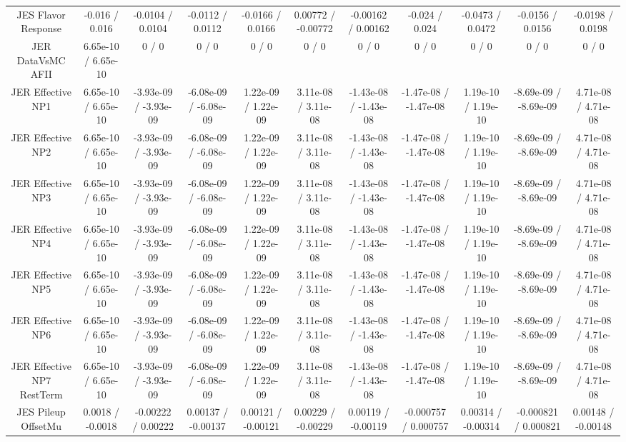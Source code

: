 \begin{table}[htbp]
\begin{center}
\begin{tabular}{|c|c|c|c|c|c|c|c|c|c|c|}
  JES Flavor Response & -0.016 / 0.016 & -0.0104 / 0.0104 & -0.0112 / 0.0112 & -0.0166 / 0.0166 & 0.00772 / -0.00772 & -0.00162 / 0.00162 & -0.024 / 0.024 & -0.0473 / 0.0472 & -0.0156 / 0.0156 & -0.0198 / 0.0198 \\ 
  JER DataVsMC AFII & 6.65e-10 / 6.65e-10 & 0 / 0 & 0 / 0 & 0 / 0 & 0 / 0 & 0 / 0 & 0 / 0 & 0 / 0 & 0 / 0 & 0 / 0 \\ 
  JER Effective NP1 & 6.65e-10 / 6.65e-10 & -3.93e-09 / -3.93e-09 & -6.08e-09 / -6.08e-09 & 1.22e-09 / 1.22e-09 & 3.11e-08 / 3.11e-08 & -1.43e-08 / -1.43e-08 & -1.47e-08 / -1.47e-08 & 1.19e-10 / 1.19e-10 & -8.69e-09 / -8.69e-09 & 4.71e-08 / 4.71e-08 \\ 
  JER Effective NP2 & 6.65e-10 / 6.65e-10 & -3.93e-09 / -3.93e-09 & -6.08e-09 / -6.08e-09 & 1.22e-09 / 1.22e-09 & 3.11e-08 / 3.11e-08 & -1.43e-08 / -1.43e-08 & -1.47e-08 / -1.47e-08 & 1.19e-10 / 1.19e-10 & -8.69e-09 / -8.69e-09 & 4.71e-08 / 4.71e-08 \\ 
  JER Effective NP3 & 6.65e-10 / 6.65e-10 & -3.93e-09 / -3.93e-09 & -6.08e-09 / -6.08e-09 & 1.22e-09 / 1.22e-09 & 3.11e-08 / 3.11e-08 & -1.43e-08 / -1.43e-08 & -1.47e-08 / -1.47e-08 & 1.19e-10 / 1.19e-10 & -8.69e-09 / -8.69e-09 & 4.71e-08 / 4.71e-08 \\ 
  JER Effective NP4 & 6.65e-10 / 6.65e-10 & -3.93e-09 / -3.93e-09 & -6.08e-09 / -6.08e-09 & 1.22e-09 / 1.22e-09 & 3.11e-08 / 3.11e-08 & -1.43e-08 / -1.43e-08 & -1.47e-08 / -1.47e-08 & 1.19e-10 / 1.19e-10 & -8.69e-09 / -8.69e-09 & 4.71e-08 / 4.71e-08 \\ 
  JER Effective NP5 & 6.65e-10 / 6.65e-10 & -3.93e-09 / -3.93e-09 & -6.08e-09 / -6.08e-09 & 1.22e-09 / 1.22e-09 & 3.11e-08 / 3.11e-08 & -1.43e-08 / -1.43e-08 & -1.47e-08 / -1.47e-08 & 1.19e-10 / 1.19e-10 & -8.69e-09 / -8.69e-09 & 4.71e-08 / 4.71e-08 \\ 
  JER Effective NP6 & 6.65e-10 / 6.65e-10 & -3.93e-09 / -3.93e-09 & -6.08e-09 / -6.08e-09 & 1.22e-09 / 1.22e-09 & 3.11e-08 / 3.11e-08 & -1.43e-08 / -1.43e-08 & -1.47e-08 / -1.47e-08 & 1.19e-10 / 1.19e-10 & -8.69e-09 / -8.69e-09 & 4.71e-08 / 4.71e-08 \\ 
  JER Effective NP7 RestTerm & 6.65e-10 / 6.65e-10 & -3.93e-09 / -3.93e-09 & -6.08e-09 / -6.08e-09 & 1.22e-09 / 1.22e-09 & 3.11e-08 / 3.11e-08 & -1.43e-08 / -1.43e-08 & -1.47e-08 / -1.47e-08 & 1.19e-10 / 1.19e-10 & -8.69e-09 / -8.69e-09 & 4.71e-08 / 4.71e-08 \\ 
  JES Pileup OffsetMu & 0.0018 / -0.0018 & -0.00222 / 0.00222 & 0.00137 / -0.00137 & 0.00121 / -0.00121 & 0.00229 / -0.00229 & 0.00119 / -0.00119 & -0.000757 / 0.000757 & 0.00314 / -0.00314 & -0.000821 / 0.000821 & 0.00148 / -0.00148 \\ 

\end{tabular}
\end{center}
\end{table}
